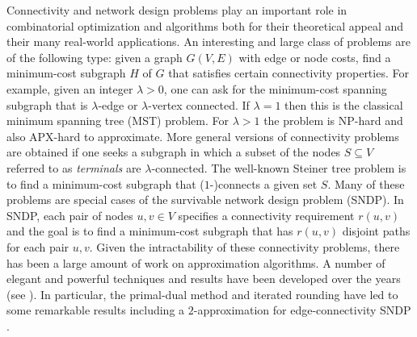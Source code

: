 \documentclass[11pt]{article}
\begin{document}
Connectivity and network design problems play an important role in
combinatorial optimization and algorithms both for their theoretical
appeal and their many real-world applications. An interesting and
large class of problems are of the following type: given a graph
$G(V,E)$ with edge or node costs, find a minimum-cost subgraph $H$ of
$G$ that satisfies certain connectivity properties. For example, given
an integer $\lambda > 0$, one can ask for the minimum-cost spanning
subgraph that is $\lambda$-edge or $\lambda$-vertex connected. If
$\lambda=1$ then this is the classical minimum spanning tree (MST)
problem. For $\lambda > 1$ the problem is NP-hard and also APX-hard to
approximate. More general versions of connectivity problems are
obtained if one seeks a subgraph in which a subset of the nodes $S
\subseteq V$ referred to as {\em terminals} are $\lambda$-connected.
The well-known Steiner tree problem is to find a minimum-cost subgraph
that ($1$-)connects a given set $S$. Many of these problems are
special cases of the survivable network design problem (SNDP). In
SNDP, each pair of nodes $u,v \in V$ specifies a connectivity
requirement $r(u,v)$ and the goal is to find a minimum-cost subgraph
that has $r(u,v)$ disjoint paths for each pair $u,v$. Given the
intractability of these connectivity problems, there has been a large
amount of work on approximation algorithms. A number of elegant and
powerful techniques and results have been developed over the years
(see \cite{Hochbaum96,Vazirani01}). In particular, the primal-dual
method \cite{AgrawalKR95,GoemansW96} and iterated rounding \cite{Jain}
have led to some remarkable results including a $2$-approximation for
edge-connectivity SNDP \cite{Jain}.
\end{document}
